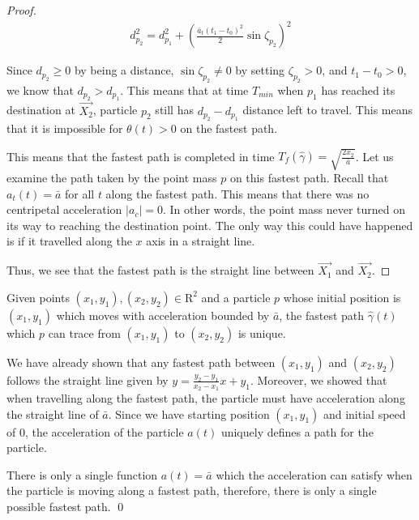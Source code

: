 \begin{proof}
\begin{eqnarray}
d_{p_2}^2 = d_{p_1}^2 + \left(\frac{\bar{a}_t (t_1 - t_0)^2}{2} \sin \zeta_{p_2} \right)^2
\end{eqnarray}

Since $d_{p_2} \geq 0$ by being a distance, $\sin \zeta_{p_2} \neq 0$ by setting $\zeta_{p_2} > 0$, and $t_1 - t_0 > 0$, we know that $d_{p_2} > d_{p_1}$. This means that at time $T_{min}$ when $p_1$ has reached its destination at $\Vec{X_2}$, particle $p_2$ still has $d_{p_2} - d_{p_1}$ distance left to travel. This means that it is impossible for $\theta(t) > 0$ on the fastest path.

This means that the fastest path is completed in time $T_f(\hat{\gamma}) = \sqrt{\frac{2 x_2}{\bar{a}}}$. Let us examine the path taken by the point mass $p$ on this fastest path. Recall that $a_t(t) = \bar{a}$ for all $t$ along the fastest path. This means that there was no centripetal acceleration $|a_c| = 0$. In other words, the point mass never turned on its way to reaching the destination point. The only way this could have happened is if it travelled along the $x$ axis in a straight line.

Thus, we see that the fastest path is the straight line between $\vec{X_1}$ and $\vec{X_2}$.
\end{proof}

\begin{corollary}
  Given points $(x_1, y_1), (x_2, y_2) \in \mathrm{R}^2$ and a particle $p$ whose initial position is $(x_1, y_1)$ which moves with acceleration bounded by $\bar{a}$, the fastest path $\hat{\gamma}(t)$ which $p$ can trace from $(x_1, y_1)$ to $(x_2, y_2)$ is unique.
\end{corollary}
\proof We have already shown that any fastest path between $(x_1, y_1)$ and $(x_2, y_2)$ follows the straight line given by $y = \frac{y_2 - y_1}{x_2 - x_1} x + y_1$. Moreover, we showed that when travelling along the fastest path, the particle must have acceleration along the straight line of $\bar{a}$. Since we have starting position $(x_1, y_1)$ and initial speed of $0$, the acceleration of the particle $a(t)$ uniquely defines a path for the particle.

There is only a single function $a(t) = \bar{a}$ which the acceleration can satisfy when the particle is moving along a fastest path, therefore, there is only a single possible fastest path.
\qed



